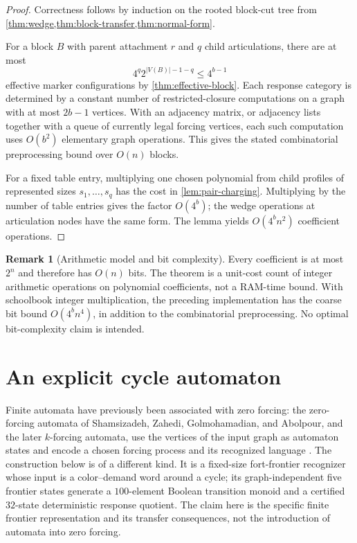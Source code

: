 \documentclass[11pt,reqno]{amsart}
\theoremstyle{definition}
\newtheorem{remark}[remark]{Remark}
\begin{document}
\begin{proof}
Correctness follows by induction on the rooted block-cut tree from
\cref{thm:wedge,thm:block-transfer,thm:normal-form}.

For a block $B$ with parent attachment $r$ and $q$ child articulations, there
are at most
\[
  4^q2^{|V(B)|-1-q}\le 4^{b-1}
\]
effective marker configurations by \cref{thm:effective-block}.  Each response category is determined by a constant number of restricted-closure
computations on a graph with at most $2b-1$ vertices.  With an adjacency
matrix, or adjacency lists together with a queue of currently legal forcing
vertices, each such computation uses $O(b^2)$ elementary graph operations.
This gives the stated combinatorial preprocessing bound over $O(n)$ blocks.

For a fixed table entry, multiplying one chosen polynomial from child profiles
of represented sizes $s_1,\ldots,s_q$ has the cost in
\cref{lem:pair-charging}.  Multiplying by the number of table entries gives the
factor $O(4^{b})$; the wedge operations at articulation nodes have the same
form.  The lemma yields $O(4^{b}n^2)$ coefficient operations.
\end{proof}

\begin{remark}[Arithmetic model and bit complexity]\label{rem:bit-complexity}
Every coefficient is at most $2^n$ and therefore has $O(n)$ bits.  The theorem
is a unit-cost count of integer arithmetic operations on polynomial
coefficients, not a RAM-time bound.
With schoolbook integer multiplication, the preceding implementation has the
coarse bit bound $O(4^{b}n^4)$, in addition to the combinatorial preprocessing.
No optimal bit-complexity claim is intended.
\end{remark}

\section{An explicit cycle automaton}\label{sec:cactus}

Finite automata have previously been associated with zero forcing: the
zero-forcing automata of Shamsizadeh, Zahedi, Golmohamadian, and Abolpour, and
the later $k$-forcing automata, use the vertices of the input graph as automaton
states and encode a chosen forcing process and its recognized language
\cite{ShamsizadehEtAl2021,ShamsizadehEtAl2024}.  The construction below is of
a different kind.  It is a fixed-size fort-frontier recognizer whose input is
a color--demand word around a cycle; its graph-independent five frontier
states generate a $100$-element Boolean transition monoid and a certified
$32$-state deterministic response quotient.  The claim here is the
specific finite frontier representation and its transfer consequences, not
the introduction of automata into zero forcing.
\end{document}
